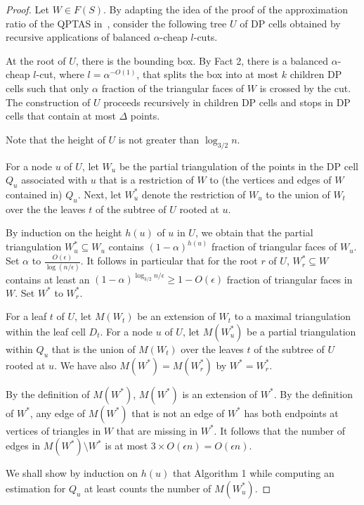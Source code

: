 \documentclass[a4paper]{article}
\begin{document}
\begin{proof}
Let $W\in F(S)$. By adapting the idea
of the proof of the approximation ratio
of the QPTAS in~\cite{AW14}, consider the following
tree $U$ of DP cells obtained by recursive
applications of balanced $\alpha$-cheap $l$-cuts.

At the root of $U$, there is the bounding box.
By Fact 2, there is a balanced $\alpha$-cheap $l$-cut,
where $l=\alpha^{-O(1)}$,
that splits
the box into at most $k$ children DP cells such that only
$\alpha $ fraction of the triangular faces
of $W$ is crossed by the cut. The construction
of $U$ proceeds recursively in children DP cells
and stops in DP cells that contain at most
$\Delta$ points.

Note that the height of $U$
is not greater than $\log_{3/2}n $.

For a node $u$ of $U$, let $W_u$ 
be the partial triangulation
of the points in the DP cell $Q_u$ associated
with $u$ that is a restriction of $W$
to (the vertices and edges of $W$ contained in) $Q_u$.
Next, let $W_u^*$ denote
the restriction of $W_u$ to
the union of $W_t$ over the 
the leaves $t$ of the subtree of $U$ rooted
at $u$.

By induction on the height $h(u)$
of $u$ in $U$, we obtain that
the partial triangulation $W^*_u\subseteq W_u$
contains $(1-\alpha )^{h(u)}$ fraction
of triangular faces of $W_u$.
Set $\alpha $ to $\frac {O(\epsilon ) }{\log (n/\epsilon)}$.
It follows in particular that
for the root $r$ of $U$,
$W_r^*\subseteq W$ contains
at least an $(1-\alpha )^{\log_{3/2}n/{\epsilon}}\ge 
1-O(\epsilon)$ fraction of triangular faces
in $W$. Set $W^*$ to $W_r^*$.


For a leaf $t$ of $U$, let $M(W_t)$
be an extension of $W_t$ to a maximal
triangulation within the leaf cell $D_t$.
For a node $u$ of $U$, let $M(W^*_u)$
be a partial triangulation within $Q_u$
that is the union of $M(W_t)$
over the leaves $t$ of the subtree of $U$ rooted
at $u$. We have also $M(W^*)=M(W^*_r)$
by $W^*=W_r^*$. 

By the definition of $M(W^*)$,
$M(W^*)$ is an extension of $W^*$.
By the definition of $W^*$,
any edge of $M(W^*)$ that
is not an edge of $W^*$
has both endpoints at vertices
of triangles in $W$ that are
missing in $W^*$. It follows
that the number of edges
in $M(W^*)\setminus W^*$
is at most
$3\times O(\epsilon n)=O(\epsilon n)$.

We shall show by induction on $h(u)$
that Algorithm 1 while computing
an estimation for $Q_u$ 
at least counts 
the number of $M(W_u^*)$.


\end{proof}
\end{document}
